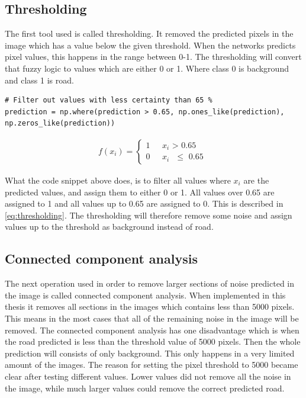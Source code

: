 \documentclass[USenglish]{ifimaster}  %
\begin{document}
\subsection{Thresholding}
The first tool used is called thresholding. It removed the predicted pixels in the image which has a value below the given threshold. When the networks predicts pixel values, this happens in the range between 0-1. The thresholding will convert that fuzzy logic to values which are either 0 or 1. Where class 0 is background and class 1 is road.
\begin{verbatim}
# Filter out values with less certainty than 65 %
prediction = np.where(prediction > 0.65, np.ones_like(prediction), 
np.zeros_like(prediction))
\end{verbatim}

\begin{equation}\label{eq:thresholding}
\begin{aligned}
{f(x_i)=
\begin{cases}
    1 & \text{ $x_i$ > 0.65 }  \\
    0 & \text{ $x_i$ $\leq$ 0.65 }
\end{cases}}
\end{aligned}
\end{equation}

What the code snippet above does, is to filter all values where $x_i$ are the predicted values, and assign them to either 0 or 1. All values over 0.65 are assigned to 1 and all values up to 0.65 are assigned to 0. This is described in \cref{eq:thresholding}. The thresholding will therefore remove some noise and assign values up to the threshold as background instead of road.  
\subsection{Connected component analysis}
The next operation used in order to remove larger sections of noise predicted in the image is called connected component analysis. When implemented in this thesis it removes all sections in the images which contains less than 5000 pixels. This means in the most cases that all of the remaining noise in the image will be removed. The connected component analysis has one disadvantage which is when the road predicted is less than the threshold value of 5000 pixels. Then the whole prediction will consists of only background. This only happens in a very limited amount of the images. The reason for setting the pixel threshold to 5000 became clear after testing different values. Lower values did not remove all the noise in the image, while much larger values could remove the correct predicted road. 
\end{document}
